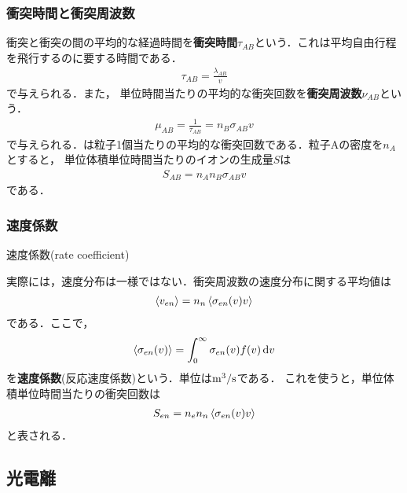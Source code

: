\documentclass{report}
\begin{document}
      \subsubsection{衝突時間と衝突周波数}
        衝突と衝突の間の平均的な経過時間を\textbf{衝突時間}$\tau_{AB}$という．これは平均自由行程を飛行するのに要する時間である．
        \begin{align}
          \tau_{AB} = \frac{\lambda_{AB}}{v} \label{eq:collision_time}
        \end{align}
        で与えられる．また，
        単位時間当たりの平均的な衝突回数を\textbf{衝突周波数}$\nu_{AB}$という．
        \begin{align}
          \mu_{AB} = \frac{1}{\tau_{AB}} = n_B \sigma_{AB} v \label{eq:collision_frequency}
        \end{align}
        で与えられる．は粒子1個当たりの平均的な衝突回数である．粒子Aの密度を$n_A$とすると，
        単位体積単位時間当たりのイオンの生成量$S$は
        \begin{align}
          S_{AB} = n_A n_B \sigma_{AB} v
        \end{align}
        である．

      \subsubsection{速度係数}
        速度係数(rate coefficient)

        実際には，速度分布は一様ではない．衝突周波数の速度分布に関する平均値は
        \begin{align}
          \ev{v_{en}} = n_n \ev{\sigma_{en}(v)v}
        \end{align}
        である．ここで，
        \begin{align}
          \ev{\sigma_{en}(v)} = \int_0^{\infty} \sigma_{en}(v)f(v)\dd{v}
        \end{align}
        を\textbf{速度係数}(反応速度係数)という．単位は$\mathrm{m^3/s}$である．
        これを使うと，単位体積単位時間当たりの衝突回数は
        \begin{align}
          S_{en} = n_e n_n \ev{\sigma_{en}(v)v}
        \end{align}
        と表される．
\subsection{光電離}
\end{document}
